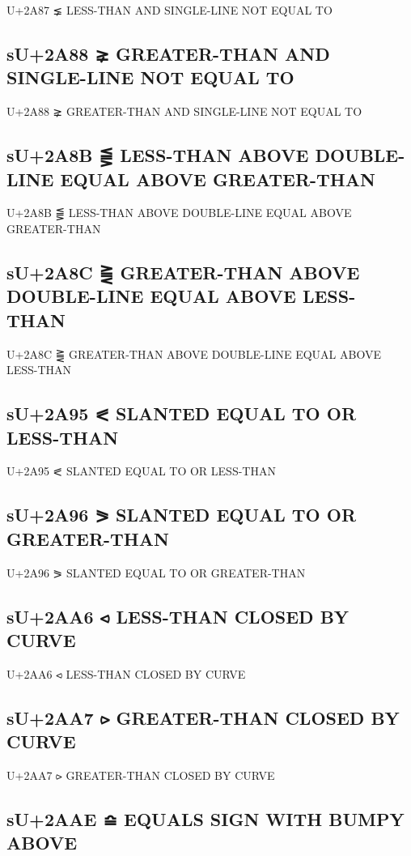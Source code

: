 U+2A87 ⪇ LESS-THAN AND SINGLE-LINE NOT EQUAL TO

\subsection{sU+2A88 ⪈ GREATER-THAN AND SINGLE-LINE NOT EQUAL TO}

U+2A88 ⪈ GREATER-THAN AND SINGLE-LINE NOT EQUAL TO

\subsection{sU+2A8B ⪋ LESS-THAN ABOVE DOUBLE-LINE EQUAL ABOVE GREATER-THAN}

U+2A8B ⪋ LESS-THAN ABOVE DOUBLE-LINE EQUAL ABOVE GREATER-THAN

\subsection{sU+2A8C ⪌ GREATER-THAN ABOVE DOUBLE-LINE EQUAL ABOVE LESS-THAN}

U+2A8C ⪌ GREATER-THAN ABOVE DOUBLE-LINE EQUAL ABOVE LESS-THAN

\subsection{sU+2A95 ⪕ SLANTED EQUAL TO OR LESS-THAN}

U+2A95 ⪕ SLANTED EQUAL TO OR LESS-THAN

\subsection{sU+2A96 ⪖ SLANTED EQUAL TO OR GREATER-THAN}

U+2A96 ⪖ SLANTED EQUAL TO OR GREATER-THAN

\subsection{sU+2AA6 ⪦ LESS-THAN CLOSED BY CURVE}

U+2AA6 ⪦ LESS-THAN CLOSED BY CURVE

\subsection{sU+2AA7 ⪧ GREATER-THAN CLOSED BY CURVE}

U+2AA7 ⪧ GREATER-THAN CLOSED BY CURVE

\subsection{sU+2AAE ⪮ EQUALS SIGN WITH BUMPY ABOVE}

